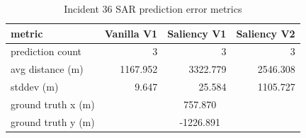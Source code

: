 \begin{table}[ht]
\centering
\caption{Incident 36 SAR prediction error metrics}
\label{tab:sar-incident-36}
\begin{tabular}{lrrr}
\hline
metric & Vanilla V1 & Saliency V1 & Saliency V2 \\
\hline
prediction count & 3 & 3 & 3 \\
avg distance (m) & 1167.952 & 3322.779 & 2546.308 \\
stddev (m) & 9.647 & 25.584 & 1105.727 \\
ground truth x (m) & \multicolumn{3}{c}{757.870} \\
ground truth y (m) & \multicolumn{3}{c}{-1226.891} \\
\hline
\end{tabular}
\end{table}
